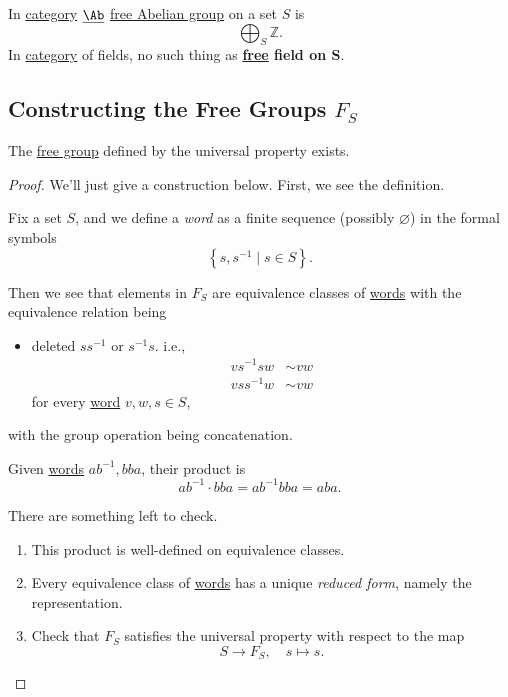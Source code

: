 \begin{eg}
	In \hyperref[def:category]{category} \(\underline{\Ab}\) \hyperref[def:free-Abelian-group]{free Abelian group} on a set \(S\) is
	\[
		\bigoplus_S \mathbb{Z}.
	\]
	In \hyperref[def:category]{category} of fields, no such thing as \textbf{\hyperref[def:free-group]{free} field on \(\bm{S} \)}.
\end{eg}

\subsection{Constructing the Free Groups \(F_S\)}
\begin{proposition}
	The \hyperref[def:free-group]{free group} defined by the universal property exists.
\end{proposition}
\begin{proof}
	We'll just give a construction below. First, we see the definition.
	\begin{definition}[Word]\label{def:word}
		Fix a set \(S\), and we define a \emph{word} as a finite sequence (possibly \(\varnothing \))
		in the formal symbols
		\[
			\left\{s, s ^{-1} \mid s\in S\right\}.
		\]
	\end{definition}

	Then we see that elements in \(F_S\) are equivalence classes of \hyperref[def:word]{words} with the equivalence relation being
	\begin{itemize}
		\item deleted \(s s ^{-1} \) or \(s ^{-1} s\). i.e.,
		      \[
			      \begin{split}
				      vs ^{-1} s w   & \sim vw \\
				      v s s ^{-1}  w & \sim vw
			      \end{split}
		      \]
		      for every \hyperref[def:word]{word} \(v, w, s\in S\),
	\end{itemize}
	with the group operation being concatenation.
	\begin{eg}
		Given \hyperref[def:word]{words} \(ab^{-1} , bba\), their product is
		\[
			ab^{-1} \cdot bba = ab^{-1}  bb a = aba.
		\]
	\end{eg}
	\begin{exercise}
		There are something left to check.
		\begin{enumerate}[(1)]
			\item This product is well-defined on equivalence classes.
			\item Every equivalence class of \hyperref[def:word]{words} has a unique \emph{reduced form}, namely the representation.
			\item Check that \(F_S\) satisfies the universal property with respect to the map
			      \[
				      S\to F_S,\quad s\mapsto s.
			      \]
		\end{enumerate}
	\end{exercise}
\end{proof}

